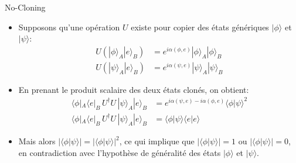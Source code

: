 \documentclass[aspectratio=169,12pt]{beamer}
\begin{document}
\begin{frame}{No-Cloning}
    \begin{itemize}
        \item Supposons qu'une opération $U$ existe pour copier des états génériques $|\phi \rangle$ et $|\psi \rangle$:
        \begin{align*}
            U(|\phi \rangle _{A}|e\rangle _{B}) &= e^{i\alpha (\phi ,e)}|\phi \rangle _{A}|\phi \rangle _{B} \\
            U(|\psi \rangle _{A}|e\rangle _{B}) &= e^{i\alpha (\psi ,e)}|\psi \rangle _{A}|\psi \rangle _{B}
        \end{align*}
        \item En prenant le produit scalaire des deux états clonés, on obtient:
        \begin{align*}
            \langle \phi|_{A}\langle e|_{B} \, U^\dagger U \, |\psi \rangle _{A}|e\rangle _{B} &= e^{i\alpha (\psi ,e)-i\alpha (\phi ,e)}\langle \phi |\psi \rangle ^{2} \\
            \langle \phi|_{A}\langle e|_{B} \, U^\dagger U \, |\psi \rangle _{A}|e\rangle _{B} &= \langle \phi |\psi \rangle \langle e |e \rangle
        \end{align*}
        \item Mais alors $|\langle \phi |\psi \rangle| = |\langle \phi |\psi \rangle|^{2}$, ce qui implique que $|\langle \phi |\psi \rangle |=1$ ou $|\langle \phi |\psi \rangle |=0$, en contradiction avec l'hypothèse de généralité des états $|\phi \rangle$ et $|\psi \rangle$.
    \end{itemize}
\end{frame}
\end{document}
